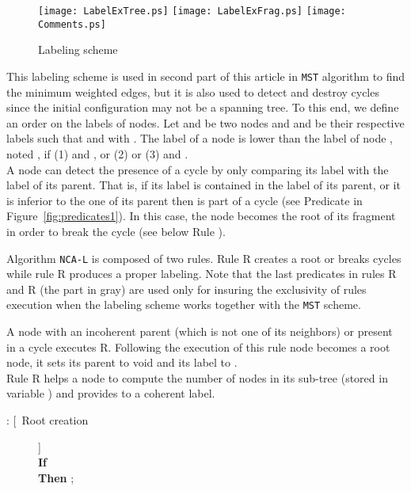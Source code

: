 \documentclass[11pt,a4paper]{article}
\newcommand{\RRoot}{\mbox{\rm R}} 	\newcommand{\RRLC}{\mbox{\rm R}}\newcommand{\RLC}{\mbox{\rm R}} \newcommand{\RMin}{\mbox{\rm R}}
\newcommand{\MST}{\mbox{\tt MST}}
\newcommand{\LabA}{\mbox{\tt NCA-L}}
\begin{document}
\begin{figure}[htbp]
\begin{center}
\texttt{[image: LabelExTree.ps]}
\texttt{[image: LabelExFrag.ps]}
\texttt{[image: Comments.ps]}
\caption{Labeling scheme}
\label{fig:label}
\end{center}
\end{figure}
This labeling scheme is used in second part of this article in  \MST\/ algorithm to find the minimum weighted edges, but it is also used to detect and destroy cycles since the initial configuration may not be a spanning tree. To this end, we define an order  on the 
labels of nodes. 
Let  and  be two nodes and 
 and  be their respective labels 
such that  and  
with . The label of a node  is lower than the label of node , noted , if (1)  and , or (2)  or (3)  and .\\

A node  can detect the presence of a cycle by only comparing its label with the label of its parent. That is, if its label 
is contained in the label of its parent, or it is inferior to the one of 
its parent then  is part of a cycle (see Predicate  in Figure~\ref{fig:predicates1}). In this case, the node  becomes the root of its fragment in order to break the cycle (see below Rule ). 


 Algorithm \LabA\/ is composed of two rules. Rule \RRoot\/ 
creates a root or breaks cycles while rule \RLC\/ produces a proper 
labeling. Note that the last predicates in rules \RRoot\/ and \RLC\/ 
(the part in gray) are used only for insuring the exclusivity of rules execution when the labeling scheme works together with the \MST\/ scheme.
 


A node  with an incoherent parent (which is not one of its neighbors) 
or present in a cycle executes \RRoot\/. Following the execution of this rule 
node  becomes a root node, it sets its parent to void and its label to .\\


Rule \RLC\/ helps a node  to compute the number of nodes in 
its sub-tree (stored in variable ) and provides to  a coherent label. 






\begin{description}
\item[: [\ Root creation]] \\
\textbf{If}  \textcolor[gray]{0.5}{}\\
\textbf{Then} ;
\end{description}
\end{document}
